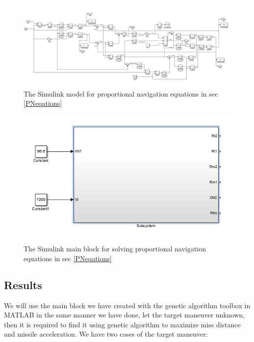 \begin{landscape}
	\begin{figure}[H]
		\centering
		\includegraphics[scale = 0.70]{fig/PNeq.PNG}
		\caption{The Simulink model for proportional navigation equations in sec \ref{PNeqations}}
		\label{PN eq}
	\end{figure}
\end{landscape}


\begin{figure}[H]
	\centering
	\includegraphics[scale = 0.75]{fig/PNmainBlock.PNG}
	\caption{The Simulink main block for solving proportional navigation equations in sec \ref{PNeqations}}
	\label{PN main block}
\end{figure}



\subsection{Results}
We will use the main block we have created with the genetic algorithm toolbox in MATLAB in the same manner we have done, let the target maneuver unknown, then it is required to find it using genetic algorithm to maximize miss distance and missile acceleration. We have two cases of the target maneuver:

